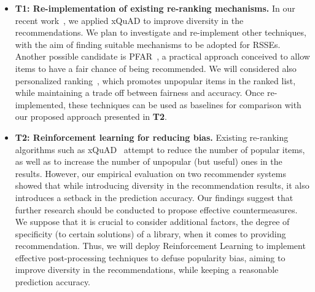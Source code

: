 \begin{itemize}
	\item \textbf{T1: Re-implementation of existing re-ranking mechanisms.} In our recent work~\cite{10174041}, we applied xQuAD \cite{10.1145/1772690.1772780} %
	to improve diversity in the recommendations. %
	We plan to investigate and re-implement other %
	techniques, with the aim of finding suitable mechanisms to be adopted for RSSEs. Another possible candidate is PFAR~\cite{DBLP:journals/corr/abs-1809-02921}, a practical approach conceived to allow items to have a fair chance of being recommended. We will considered also personalized ranking~\cite{DBLP:conf/flairs/AbdollahpouriBM19}, which promotes unpopular items in the ranked list, while maintaining a trade off between fairness and accuracy. Once re-implemented, these techniques can be used as baselines for comparison with our proposed approach presented in \textbf{T2}. %
	\item \textbf{T2: Reinforcement learning for reducing bias.} Existing re-ranking algorithms such as xQuAD~\cite{10.1145/1772690.1772780} %
	attempt to reduce the number of popular items, as well as to increase the number of unpopular (but useful) ones in the results. However, our empirical evaluation on two recommender systems showed that while introducing diversity in the recommendation results, it also introduces a setback in the prediction accuracy. Our findings suggest that %
	further research should be conducted to propose effective countermeasures. We suppose that it is crucial to consider %
	additional factors, \eg the degree of specificity (to certain solutions) of a library, when it comes to providing recommendation. Thus, we will deploy Reinforcement Learning to implement effective post-processing techniques to defuse popularity bias, aiming to improve diversity in the recommendations, while keeping a reasonable prediction accuracy. %

\end{itemize}
